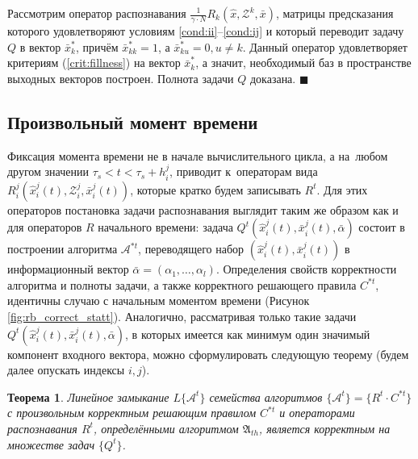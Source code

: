 \documentclass[a4paper, 12pt]{article}
\theoremstyle{plain}
\newtheorem{Theorem}{Теорема}
\newenvironment{Proof}%
	{\par\noindent{\bf Доказательство.}}%
	{\hfill$\scriptstyle\blacksquare$}
\begin{document}
\begin{Proof}
		 Рассмотрим оператор распознавания $\frac{1}{\gamma\cdot N}R_k(\hat x,\mathcal Z^k,\bar x)$, матрицы предсказания которого удовлетворяют условиям \ref{cond:ii}--\ref{cond:ij} и который переводит задачу $Q$ в вектор $\bar x_k^*$, причём $\bar x_{kk}^*=1$, а $\bar x_{ku}^*=0, u\neq k$. Данный оператор удовлетворяет критериям (\ref{crit:fillness}) на вектор $\bar x_k^*$, а значит, необходимый баз в пространстве выходных векторов построен. Полнота задачи $Q$ доказана.
	\end{Proof}
	
	\subsection{Произвольный момент времени}
	Фиксация момента времени не в начале вычислительного цикла, а на~любом другом значении $\tau_s<t<\tau_s+h_i^j$, приводит к~операторам вида $R_i^j(\hat{x}_i^j(t), \mathcal{Z}_i^j, \bar{x}_i^j(t))$, которые кратко будем записывать $R^t$. Для этих операторов постановка задачи распознавания выглядит таким же образом как и для операторов $R$ начального времени: задача $Q^t(\hat{x}_i^j(t), \bar{x}_i^j(t), \bar\alpha)$ состоит в построении алгоритма $\mathcal A^{*t}$, переводящего набор $(\hat{x}_i^j(t), \bar{x}_i^j(t))$ в информационный вектор $\bar\alpha=(\alpha_1,\dots,\alpha_l)$. Определения свойств корректности алгоритма и полноты задачи, а также корректного решающего правила $C^{*t}$, идентичны случаю с начальным моментом времени (Рисунок \ref{fig:rb_correct_statt}). Аналогично, рассматривая только такие задачи $Q^t(\hat{x}_i^j(t), \bar{x}_i^j(t), \bar\alpha)$, в которых имеется как минимум один значимый компонент входного вектора, можно сформулировать следующую теорему (будем далее опускать индексы $i,j$).
	
	\begin{Theorem}
		\label{th:correctness_t}
		Линейное замыкание $L\{\mathcal A^t\}$ семейства алгоритмов $\{\mathcal A^t\}=\{R^t\cdot C^{*t}\}$ с произвольным корректным решающим правилом $C^{*t}$ и операторами распознавания $R^t$, определёнными алгоритмом $\mathfrak A_{th}$, является корректным на множестве задач $\{Q^t\}$.
	\end{Theorem}
	
\end{document}
